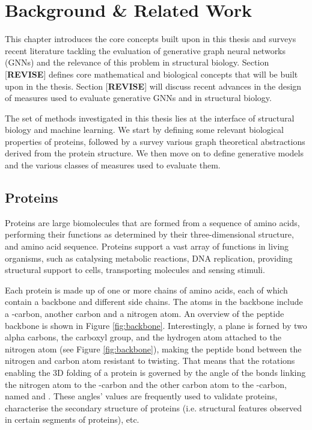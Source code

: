 \chapter{Background \& Related Work}

This chapter introduces the core concepts built upon in this thesis and surveys
recent literature tackling the evaluation of generative graph neural networks (GNNs)
and the relevance of this problem in structural biology. Section
[\textbf{REVISE}] defines core mathematical and biological concepts that will
be built upon in the thesis. Section [\textbf{REVISE}] will discuss recent
advances in the design of measures used to evaluate generative GNNs and in
structural biology.

The set of methods investigated in this thesis lies at the interface of
structural biology and machine learning. We start by defining some relevant
biological properties of proteins, followed by a survey various graph theoretical
abstractions derived from the protein structure. We then move on to define
generative models and the various classes of measures used to evaluate them.

\section{Proteins}\label{background:proteins}

Proteins are large biomolecules that are formed from a sequence of amino acids,
performing their functions as determined by their three-dimensional structure, and amino
acid sequence. Proteins support a vast array of functions in living organisms,
such as catalysing metabolic reactions, DNA replication, providing structural
support to cells, transporting molecules and sensing stimuli.

Each protein is made up of one or more chains of amino acids, each of which
contain a backbone and different side chains. The atoms in the backbone include
a \textalpha{}-carbon, another carbon and a nitrogen atom. An overview of the
peptide backbone is shown in Figure \ref{fig:backbone}. Interestingly, a plane
is forned by two alpha carbons, the carboxyl group, and the hydrogen atom attached
to the nitrogen atom (see Figure \ref{fig:backbone}), making the peptide bond
between the nitrogen and carbon atom resistant to twisting. That means that the
rotations enabling the 3D folding of a protein is governed by the angle of the bonds linking
the nitrogen atom to the \textalpha{}-carbon and the other carbon atom to the
\textalpha{}-carbon, named \textphi{} and \textpsi{}. These angles' values are
frequently used to validate proteins, characterise the secondary structure of proteins
(i.e. structural features observed in certain segments of proteins), etc.


